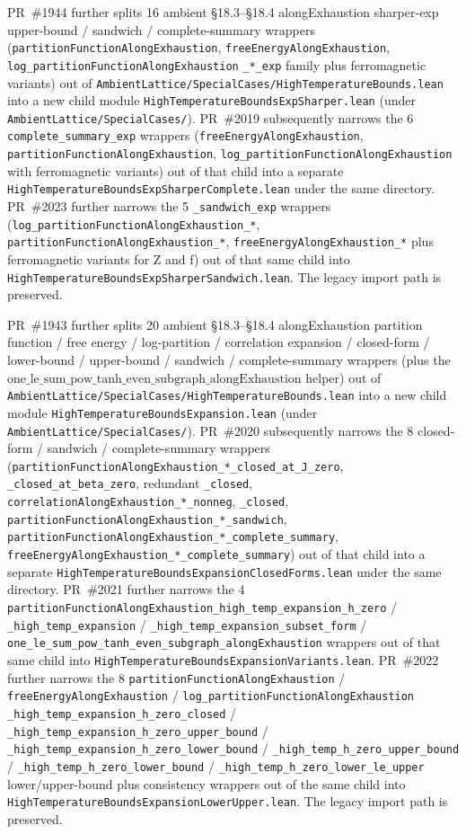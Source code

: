 \documentclass[a4paper,11pt]{article}
\begin{document}
PR~\#1944 further splits 16 ambient §18.3--§18.4 alongExhaustion
sharper-exp upper-bound / sandwich / complete-summary wrappers
(\texttt{partitionFunctionAlongExhaustion},
\texttt{freeEnergyAlongExhaustion},
\texttt{log\_partitionFunctionAlongExhaustion} \texttt{\_*\_exp} family
plus ferromagnetic variants) out of
\texttt{AmbientLattice/SpecialCases/HighTemperatureBounds.lean} into
a new child module
\texttt{HighTemperatureBoundsExpSharper.lean} (under
\texttt{AmbientLattice/SpecialCases/}). PR~\#2019 subsequently
narrows the 6 \texttt{complete\_summary\_exp} wrappers
(\texttt{freeEnergyAlongExhaustion},
\texttt{partitionFunctionAlongExhaustion},
\texttt{log\_partitionFunctionAlongExhaustion} with ferromagnetic
variants) out of that child into a separate
\texttt{HighTemperatureBoundsExpSharperComplete.lean} under the
same directory. PR~\#2023 further narrows the 5
\texttt{\_sandwich\_exp} wrappers
(\texttt{log\_partitionFunctionAlongExhaustion\_*},
\texttt{partitionFunctionAlongExhaustion\_*},
\texttt{freeEnergyAlongExhaustion\_*} plus ferromagnetic
variants for Z and f) out of that same child into
\texttt{HighTemperatureBoundsExpSharperSandwich.lean}. The legacy
import path is preserved.

PR~\#1943 further splits 20 ambient §18.3--§18.4 alongExhaustion
partition function / free energy / log-partition / correlation
expansion / closed-form / lower-bound / upper-bound / sandwich /
complete-summary wrappers (plus the
$\mathrm{one\_le\_sum\_pow\_tanh\_even\_subgraph\_alongExhaustion}$
helper) out of \texttt{AmbientLattice/SpecialCases/HighTemperatureBounds.lean}
into a new child module
\texttt{HighTemperatureBoundsExpansion.lean} (under
\texttt{AmbientLattice/SpecialCases/}). PR~\#2020 subsequently
narrows the 8 closed-form / sandwich / complete-summary wrappers
(\texttt{partitionFunctionAlongExhaustion\_*\_closed\_at\_J\_zero},
\texttt{\_closed\_at\_beta\_zero}, redundant \texttt{\_closed},
\texttt{correlationAlongExhaustion\_*\_nonneg}, \texttt{\_closed},
\texttt{partitionFunctionAlongExhaustion\_*\_sandwich},
\texttt{partitionFunctionAlongExhaustion\_*\_complete\_summary},
\texttt{freeEnergyAlongExhaustion\_*\_complete\_summary}) out of
that child into a separate
\texttt{HighTemperatureBoundsExpansionClosedForms.lean} under the
same directory. PR~\#2021 further narrows the 4
\texttt{partitionFunctionAlongExhaustion\_high\_temp\_expansion\_h\_zero}
/ \texttt{\_high\_temp\_expansion} /
\texttt{\_high\_temp\_expansion\_subset\_form} /
\texttt{one\_le\_sum\_pow\_tanh\_even\_subgraph\_alongExhaustion}
wrappers out of that same child into
\texttt{HighTemperatureBoundsExpansionVariants.lean}. PR~\#2022
further narrows the 8
\texttt{partitionFunctionAlongExhaustion} /
\texttt{freeEnergyAlongExhaustion} /
\texttt{log\_partitionFunctionAlongExhaustion}
\texttt{\_high\_temp\_expansion\_h\_zero\_closed} /
\texttt{\_high\_temp\_expansion\_h\_zero\_upper\_bound} /
\texttt{\_high\_temp\_expansion\_h\_zero\_lower\_bound} /
\texttt{\_high\_temp\_h\_zero\_upper\_bound} /
\texttt{\_high\_temp\_h\_zero\_lower\_bound} /
\texttt{\_high\_temp\_h\_zero\_lower\_le\_upper} lower/upper-bound
plus consistency wrappers out of the same child into
\texttt{HighTemperatureBoundsExpansionLowerUpper.lean}. The legacy
import path is preserved.
\end{document}
